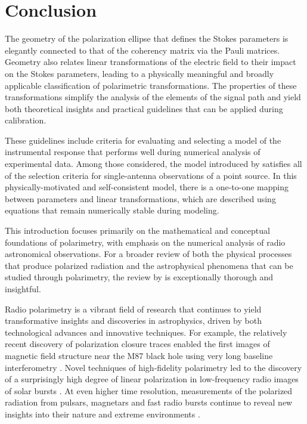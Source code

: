 \section{Conclusion}
\label{sec:conclusion}

The geometry of the polarization ellipse 
that defines the Stokes parameters is elegantly connected
to that of the coherency matrix via the Pauli matrices.
%
Geometry also relates linear transformations of the electric field 
to their impact on the Stokes parameters, leading to a physically meaningful
and broadly applicable classification of polarimetric transformations.
%
%
%
The properties of these transformations simplify the analysis of the elements of the signal path and yield both theoretical insights and practical guidelines that can be applied during calibration.

These guidelines include criteria for evaluating and selecting a model of the instrumental response that performs well during numerical analysis of experimental data.
%
%
Among those considered,  the model introduced by \citet{bri00} satisfies all of the selection criteria for single-antenna observations of a point source.
%
In this physically-motivated and self-consistent model, there is a one-to-one mapping between parameters and linear transformations, which are described
using equations that remain numerically stable during modeling.

This introduction focuses primarily on the mathematical and conceptual foundations of polarimetry, with emphasis on the numerical analysis of radio astronomical observations.  For a broader review of both the physical processes that produce polarized radiation and the astrophysical phenomena that can be studied through polarimetry, the review by \cite{tri14} is exceptionally thorough and insightful.

Radio polarimetry is a vibrant field of research that continues to yield transformative insights and discoveries in astrophysics, driven by both technological advances and innovative techniques.  For example, the relatively recent discovery of polarization closure traces \citep{bp20,snt22} enabled the first images of magnetic field structure near the M87 black hole using very long baseline interferometry \citep{2021ApJ...910L..13E}.
%
Novel techniques of high-fidelity polarimetry led to the discovery of a surprisingly high degree of linear polarization in low-frequency radio images of solar bursts \citep{dkom25}.
%
At even higher time resolution, measurements of the polarized radiation from pulsars, magnetars and fast radio bursts continue to reveal new insights into their nature and extreme environments \citep[e.g.,][]{crh+06,2013Natur.501..391E,2018Natur.553..182M,ptv+22}.

